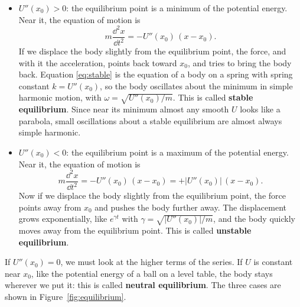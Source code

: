 \documentclass[11pt,a4paper]{article}
\begin{document}
\begin{itemize}
\item $U''(x_0) > 0$: the equilibrium point is a minimum of the potential energy. Near it, the
  equation of motion is
  \begin{equation}\label{eq:stable}
    m\frac{\dd^2 x}{\dd t^2} = -U''(x_0)\,(x - x_0) .
  \end{equation}
  If we displace the body slightly from the equilibrium point, the force, and with it the
  acceleration, points back toward $x_0$, and tries to bring the body back. Equation
  \eqref{eq:stable} is the equation of a body on a spring with spring constant $k = U''(x_0)$, so the
  body oscillates about the minimum in simple harmonic motion, with $\omega = \sqrt{U''(x_0)/m}$. This
  is called \textbf{stable equilibrium}. Since near its minimum almost any smooth $U$ looks like a
  parabola, small oscillations about a stable equilibrium are almost always simple harmonic.
\item $U''(x_0) < 0$: the equilibrium point is a maximum of the potential energy. Near it, the
  equation of motion is
  \begin{equation}\label{eq:unstable}
    m\frac{\dd^2 x}{\dd t^2} = -U''(x_0)\,(x - x_0) = +\bigl|U''(x_0)\bigr|\,(x - x_0) .
  \end{equation}
  Now if we displace the body slightly from the equilibrium point, the force points away from $x_0$
  and pushes the body further away. The displacement grows exponentially, like
  $e^{\gamma t}$ with $\gamma = \sqrt{|U''(x_0)|/m}$, and the body quickly moves away from the
  equilibrium point. This is called \textbf{unstable equilibrium}.
\end{itemize}
If $U''(x_0) = 0$, we must look at the higher terms of the series. If $U$ is constant near $x_0$,
like the potential energy of a ball on a level table, the body stays wherever we put it: this is
called \textbf{neutral equilibrium}. The three cases are shown in Figure~\ref{fig:equilibrium}.
\end{document}
